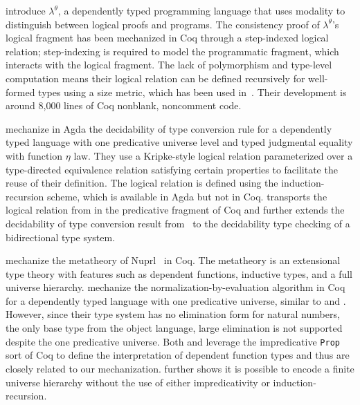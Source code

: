 \documentclass[acmsmall,screen=true,
\ifpublic review=false\else,review=true\fi
  ,anonymous=\ifanonymous true\else false\fi]{acmart}
\newcommand{\scw}[1]{}
\newcommand{\yl}[1]{}
\begin{document}
\citet{casinghino:combining-proofs-programs} introduce $\lambda^\theta$, a dependently typed
programming language that uses modality to distinguish between logical
proofs and programs. %
The consistency proof of $\lambda^\theta$'s logical fragment has been
mechanized in Coq through a step-indexed logical relation;
step-indexing is required to model the programmatic fragment, which
interacts with the logical fragment.
The lack of polymorphism and type-level computation means their
logical relation can be defined recursively for well-formed types using
a size metric, which has been used in~\citet{liu2023dependently}.
Their development is around 8,000 lines of Coq nonblank, noncomment code.

\citet{decagda} mechanize in Agda the decidability of type
conversion rule for a dependently typed language with one predicative
universe level and typed judgmental equality with function
$\eta$ law. They
use a Kripke-style logical relation parameterized over a
type-directed equivalence relation satisfying certain
properties to facilitate the reuse of their definition. The
logical relation is defined using the induction-recursion scheme,
which is available in Agda but not in Coq.
\citet{martin-lof-a-la-coq} transports the logical relation
from \citet{decagda} in the predicative fragment of Coq and further
extends the decidability of type conversion result
from~\citet{decagda} to the decidability type checking of a
bidirectional type system. \scw{How big are these proofs?}

\citet{anand2014towards} mechanize the metatheory of
Nuprl~\citep{constable1986implementing} in Coq. The metatheory is an
extensional type theory with features such as dependent functions,
inductive types, and a full universe hierarchy. \scw{What do they prove?}
\citet{nbeincoq}
mechanize the normalization-by-evaluation algorithm in Coq for a
dependently typed language with one predicative universe, similar to
\citet{decagda} and \citet{martin-lof-a-la-coq}. However, since their
type system has no elimination form for natural numbers, the
only base type from the object language, large elimination is not
supported despite the one predicative universe.
Both \citet{anand2014towards} and \citet{nbeincoq} leverage the
impredicative \texttt{Prop} sort of Coq to define the interpretation
of dependent function types and thus are closely related to our
mechanization. \citet{anand2014towards} further shows it is possible
to encode a finite universe hierarchy without the use of
either impredicativity or induction-recursion.\scw{How did the Nuprl
proof include a full hierarchy? Did they use impredicativity?}
\end{document}
